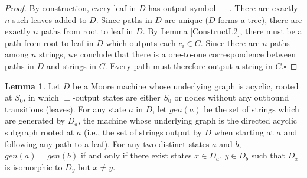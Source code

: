 \documentclass{article}
\theoremstyle{definition}
\newtheorem{lemma}{Lemma}[section]
\begin{document}
\begin{proof}
By construction, every leaf in $D$ has output symbol $\perp$.  There are exactly 
$n$ such leaves added to $D$.  Since paths in $D$ are unique ($D$ forms a tree), there are 
exactly $n$ paths from root to leaf in $D$.  By Lemma \ref{ConstructL2}, there must be a 
path from root to leaf in $D$ which outputs each $c_i \in C$.  Since there are $n$ paths 
among $n$ strings, we conclude that there is a one-to-one correspondence between paths in 
$D$ and strings in $C$.  Every path must therefore output a string in $C$.$\square$
\end{proof}

\begin{lemma}
\label{ConstructL4}
Let $D$ be a Moore machine whose underlying graph is acyclic, rooted at $S_0$, in 
which $\perp$-output states are either $S_0$ or nodes without any outbound transitions (leaves).
For any state $a$ in $D$, let $gen(a)$ be the set of strings which are generated 
by $D_a$, the machine whose underlying graph is the directed acyclic subgraph rooted at 
$a$  (i.e., the set of strings output by $D$ when starting 
at $a$ and following any path to a leaf).
\newline\newline
\noindent For any two distinct states $a$ and $b$, $gen(a) = gen(b)$ if and only if 
there exist states $x \in D_a$, $y \in D_b$ such that $D_x$ is isomorphic to $D_y$ but $x \neq y$.
\end{lemma}
\end{document}
